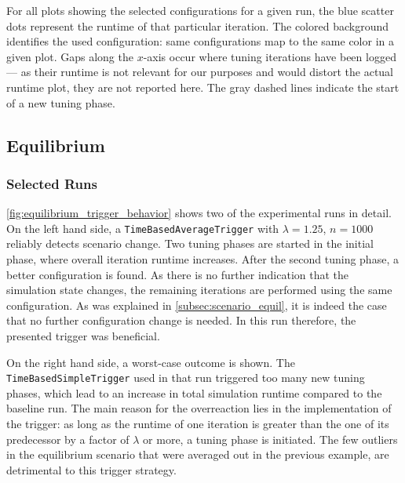 For all plots showing the selected configurations for a given run, the blue scatter dots represent the runtime of that particular iteration. The colored background identifies the used configuration: same configurations map to the same color in a given plot. Gaps along the $x$-axis occur where tuning iterations have been logged --- as their runtime is not relevant for our purposes and would distort the actual runtime plot, they are not reported here. The gray dashed lines indicate the start of a new tuning phase.


\subsection{Equilibrium}
\subsubsection{Selected Runs}
\autoref{fig:equilibrium_trigger_behavior} shows two of the experimental runs in detail.
On the left hand side, a \texttt{TimeBasedAverageTrigger} with $\lambda=1.25$, $n=1000$ reliably detects scenario change. Two tuning phases are started in the initial phase, where overall iteration runtime increases. After the second tuning phase, a better configuration is found. As there is no further indication that the simulation state changes, the remaining iterations are performed using the same configuration. As was explained in \autoref{subsec:scenario_equil}, it is indeed the case that no further configuration change is needed. In this run therefore, the presented trigger was beneficial.

On the right hand side, a worst-case outcome is shown. The \texttt{TimeBasedSimpleTrigger} used in that run triggered too many new tuning phases, which lead to an increase in total simulation runtime compared to the baseline run. The main reason for the overreaction lies in the implementation of the trigger: as long as the runtime of one iteration is greater than the one of its predecessor by a factor of $\lambda$ or more, a tuning phase is initiated. The few outliers in the equilibrium scenario that were averaged out in the previous example, are detrimental to this trigger strategy.



